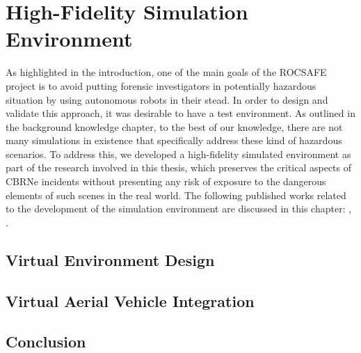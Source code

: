 \chapter{High-Fidelity Simulation Environment}\label{chap:HighFidelitySim}



As highlighted in the introduction, one of the main goals of the ROCSAFE project \cite{Bagherzadeh2017ROCSAFE:Incidents} is to avoid putting forensic investigators in potentially hazardous situation by using autonomous robots in their stead. In order to design and validate this approach, it was desirable to have a test environment. As outlined in the background knowledge chapter, to the best of our knowledge, there are not many simulations in existence that specifically address these kind of hazardous scenarios. To address this, we developed a high-fidelity simulated environment as part of the research involved in this thesis, which preserves the critical aspects of CBRNe incidents without presenting any risk of exposure to the dangerous elements of such scenes in the real world. The following published works related to the development of the simulation environment are discussed in this chapter: \cite{Smyth2018AInvestigation}, \cite{Smyth2018UsingDrones}.


\section{Virtual Environment Design}


\pagebreak
\section{Virtual Aerial Vehicle Integration}\label{sec:AirSimIntegration}


\section{Conclusion}\label{sec:VirtualEnvConclusion}

